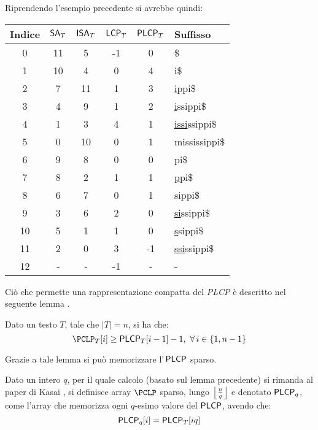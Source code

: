 \begin{esempio}
  Riprendendo l'esempio precedente si avrebbe quindi:
  \begin{table}[H]
    \centering
    \footnotesize
    \begin{tabular}{c|c|c|c|c|l} 
      \textbf{Indice} & $\mbox{\rm {\sf SA}}_T$ & $\mbox{\rm {\sf ISA}}_T$ & $\mbox{\rm {\sf LCP}}_T$
      & $\mbox{\rm {\sf PLCP}}_T$ & \textbf{Suffisso}\\  
      \hline
      0 & 11 & 5 & -1 & 0 & \$\\
      1 & 10 & 4 & 0 & 4 & i\$\\
      2 & 7 & 11 & 1 & 3 & \underline{i}ppi\$\\
      3 & 4 & 9 & 1 & 2 & \underline{i}ssippi\$\\
      4 & 1 & 3 & 4 & 1 & \underline{issi}ssippi\$\\
      5 & 0 & 10 & 0 & 1 & mississippi\$\\
      6 & 9 & 8 & 0 & 0 & pi\$\\
      7 & 8 & 2 & 1 & 1 & \underline{p}pi\$\\
      8 & 6 & 7 & 0 & 1 & sippi\$\\
      9 & 3 & 6 & 2 & 0 & \underline{si}ssippi\$\\
      10 & 5 & 1 & 1 & 0 & \underline{s}sippi\$\\
      11 & 2 & 0 & 3 & -1 & \underline{ssi}ssippi\$\\
      12 & - & - & -1 & - & - 
    \end{tabular}
  \end{table}
\end{esempio}
Ciò che permette una rappresentazione compatta del \textit{PLCP} è descritto nel
seguente lemma \cite{plcp3}.
\begin{lemma}
  Dato un testo $T$, tale che $|T|=n$, si ha che:
  \begin{equation}
    \label{eq:plcpdef3}
    \PCLP_T[i]\geq \PLCP_T[i-1]-1,\,\,\forall\, i\in\{1,n-1\}
  \end{equation}
\end{lemma}
Grazie a tale lemma si può memorizzare l'$\,\mbox{\rm {\sf PLCP}}$ sparso.
\begin{definizione}
  Dato un intero
  $q$, per il quale calcolo (basato sul lemma precedente) si rimanda al paper di
  Kasai \cite{plcp3}, si definisce array $\PCLP$ sparso, lungo
  $\left\lfloor\frac{n}{q}\right\rfloor$ e denotato $\mbox{\rm {\sf PLCP}}_q$, come l'array che
  memorizza ogni $q$-esimo valore del $\mbox{\rm {\sf PLCP}}$, avendo che:
  \begin{equation}
    \label{eq:plcpdef4}
    \mbox{\rm {\sf PLCP}}_q[i]=\mbox{\rm {\sf PLCP}}_T[iq]
  \end{equation}
\end{definizione}
